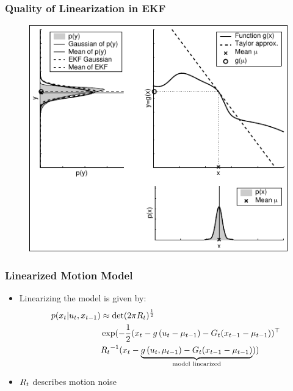 \begin{frame}
    \frametitle{Quality of Linearization in EKF}
    
    \begin{figure}[!h]
        \includegraphics[width=0.5\columnwidth]{./images/dependency_approximation_quality_narrow.pdf}
    \end{figure}
\end{frame}
    
\begin{frame}
    \frametitle{Linearized Motion Model}
    
    \begin{itemize}
        \item Linearizing the model is given by:
    \begin{align*}
    p(x_{t} | u_{t}, x _{t-1}) &\approx \det(2 \pi R_{t})^{\frac{1}{2}}\\
     &\exp (-\dfrac{1}{2} (x_{t} - g\left( u_{t}-\mu_{t-1} \right) - G_{t}(x_{t-1}-\mu_{t-1}))^{\top}\\
     &{R_{t}}^{-1} (x_{t} - \underbrace{g\left( u_{t},\mu_{t-1} \right) - G_{t} (x_{t-1}-\mu_{t-1})}_{\text{model linearized}}))
    \end{align*}
        \item $R_{t}$ describes motion noise
    \end{itemize}
\end{frame}
    
